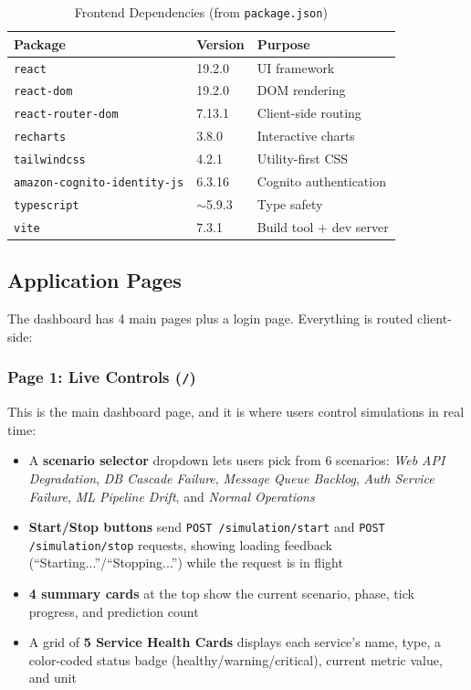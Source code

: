 \documentclass[11pt,a4paper]{article}
\begin{document}
\begin{table}[H]
\centering
\begin{tabular}{lll}
\toprule
\textbf{Package} & \textbf{Version} & \textbf{Purpose} \\
\midrule
\texttt{react} & 19.2.0 & UI framework \\
\texttt{react-dom} & 19.2.0 & DOM rendering \\
\texttt{react-router-dom} & 7.13.1 & Client-side routing \\
\texttt{recharts} & 3.8.0 & Interactive charts \\
\texttt{tailwindcss} & 4.2.1 & Utility-first CSS \\
\texttt{amazon-cognito-identity-js} & 6.3.16 & Cognito authentication \\
\texttt{typescript} & $\sim$5.9.3 & Type safety \\
\texttt{vite} & 7.3.1 & Build tool + dev server \\
\bottomrule
\end{tabular}
\caption{Frontend Dependencies (from \texttt{package.json})}
\label{tab:frontend-deps}
\end{table}

\subsection{Application Pages}

The dashboard has 4 main pages plus a login page. Everything is routed client-side:

\subsubsection{Page 1: Live Controls (\texttt{/})}

This is the main dashboard page, and it is where users control simulations in real time:
\begin{itemize}[leftmargin=2em]
    \item A \textbf{scenario selector} dropdown lets users pick from 6 scenarios: \textit{Web API Degradation}, \textit{DB Cascade Failure}, \textit{Message Queue Backlog}, \textit{Auth Service Failure}, \textit{ML Pipeline Drift}, and \textit{Normal Operations}
    \item \textbf{Start/Stop buttons} send \texttt{POST /simulation/start} and \texttt{POST /simulation/stop} requests, showing loading feedback (``Starting...''/``Stopping...'') while the request is in flight
    \item \textbf{4 summary cards} at the top show the current scenario, phase, tick progress, and prediction count
    \item A grid of \textbf{5 Service Health Cards} displays each service's name, type, a color-coded status badge (healthy/warning/critical), current metric value, and unit
\end{itemize}
\end{document}
